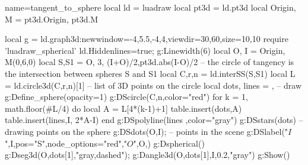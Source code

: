 \begin{luadraw}{name=tangent_to_sphere}
local ld = luadraw
local pt3d = ld.pt3d
local Origin, M = pt3d.Origin, pt3d.M

local g = ld.graph3d:new{window={-4,5.5,-4,4},viewdir={30,60},size={10,10}}
require 'luadraw_spherical'
ld.Hiddenlines=true; g:Linewidth(6)
local O, I = Origin, M(0,6,0)
local S,S1 = {O, 3}, {(I+O)/2,pt3d.abs(I-O)/2}
-- the circle of tangency is the intersection between spheres S and S1
local C,r,n = ld.interSS(S,S1) 
local L = ld.circle3d(C,r,n)[1] -- list of 3D points on the circle
local dots, lines = {}, {}
-- draw
g:Define_sphere({opacity=1})
g:DScircle({C,n},{color="red"})
for k = 1, math.floor(#L/4) do
    local A = L[4*(k-1)+1]
    table.insert(dots,A)
    table.insert(lines,{I, 2*A-I})
end
g:DSpolyline(lines ,{color="gray"})
g:DSstars(dots) -- drawing points on the sphere
g:DSdots({O,I});  -- points in the scene
g:DSlabel("$I$",I,{pos="S",node_options="red"},"$O$",O,{})
g:Dspherical()
g:Dseg3d({O,dots[1]},"gray,dashed"); g:Dangle3d(O,dots[1],I,0.2,"gray")
g:Show() 
\end{luadraw}
